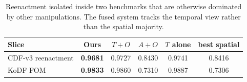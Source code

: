 \begin{table}[t]
\centering
\caption{Reenactment isolated inside two benchmarks that are otherwise dominated by other manipulations. The fused system tracks the temporal view rather than the spatial majority.}
\label{tab:slices}
\small
\begin{tabular}{lccccc}
\toprule
Slice & \textbf{Ours} & $T{+}O$ & $A{+}O$ & $T$ alone & best spatial \\
\midrule
CDF-v3 reenactment & \textbf{0.9681} & 0.9727 & 0.8430 & 0.9741 & 0.8416 \\
KoDF FOM & \textbf{0.9833} & 0.9860 & 0.7310 & 0.9887 & 0.7306 \\
\bottomrule
\end{tabular}
\end{table}
